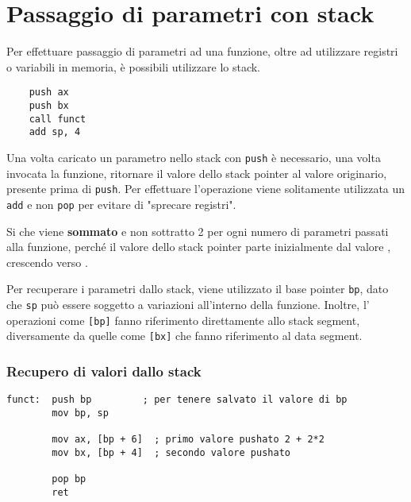 \documentclass[../template]{subfiles}
\begin{document}
\section{Passaggio di parametri con stack}
Per effettuare passaggio di parametri ad una funzione, oltre ad utilizzare registri o variabili in memoria, è possibili utilizzare lo stack.
\begin{lstlisting}
    push ax
    push bx
    call funct
    add sp, 4
\end{lstlisting}
Una volta caricato un parametro nello stack con \lstinline{push} è necessario, una volta invocata la funzione, ritornare il valore dello stack pointer al valore originario, presente prima di \lstinline{push}.
Per effettuare l'operazione viene solitamente utilizzata un \lstinline{add} e non \lstinline{pop} per evitare di "sprecare registri".

Si che viene \textbf{sommato} e non sottratto 2 per ogni numero di parametri passati alla funzione, perché il valore dello stack pointer parte inizialmente dal valore , crescendo verso .

Per recuperare i parametri dallo stack, viene utilizzato il base pointer \lstinline{bp}, dato che \lstinline{sp} può essere soggetto a variazioni all'interno della funzione.
Inoltre, l' operazioni come \lstinline{[bp]} fanno riferimento direttamente allo stack segment, diversamente da quelle come \lstinline{[bx]} che fanno riferimento al data segment.

\subsubsection{Recupero di valori dallo stack}
\begin{lstlisting}
funct:  push bp         ; per tenere salvato il valore di bp
        mov bp, sp

        mov ax, [bp + 6]  ; primo valore pushato 2 + 2*2
        mov bx, [bp + 4]  ; secondo valore pushato

        pop bp
        ret
\end{lstlisting}
\end{document}
